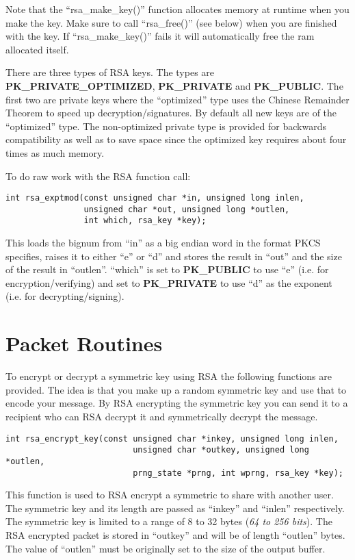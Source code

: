 \documentclass{book}
\begin{document}
Note that the ``rsa\_make\_key()'' function allocates memory at runtime when you make the key.  Make sure to call 
``rsa\_free()'' (see below) when you are finished with the key.  If ``rsa\_make\_key()'' fails it will automatically 
free the ram allocated itself.

There are three types of RSA keys.  The types are {\bf PK\_PRIVATE\_OPTIMIZED}, {\bf PK\_PRIVATE} and {\bf PK\_PUBLIC}.  The first
two are private keys where the ``optimized'' type uses the Chinese Remainder Theorem to speed up decryption/signatures.  By 
default all new keys are of the ``optimized'' type.  The non-optimized private type is provided for backwards compatibility
as well as to save space since the optimized key requires about four times as much memory.

To do raw work with the RSA function call:
\begin{verbatim}
int rsa_exptmod(const unsigned char *in, unsigned long inlen, 
                unsigned char *out, unsigned long *outlen, 
                int which, rsa_key *key);
\end{verbatim}
This loads the bignum from ``in'' as a big endian word in the format PKCS specifies, raises it to either ``e'' or ``d'' and stores the result
in ``out'' and the size of the result in ``outlen''. ``which'' is set to {\bf PK\_PUBLIC} to use ``e'' 
(i.e. for encryption/verifying) and set to {\bf PK\_PRIVATE} to use ``d'' as the exponent (i.e. for decrypting/signing).

\section{Packet Routines}
To encrypt or decrypt a symmetric key using RSA the following functions are provided.  The idea is that you make up
a random symmetric key and use that to encode your message.  By RSA encrypting the symmetric key you can send it to a
recipient who can RSA decrypt it and symmetrically decrypt the message.
\begin{verbatim}
int rsa_encrypt_key(const unsigned char *inkey, unsigned long inlen,
                          unsigned char *outkey, unsigned long *outlen,
                          prng_state *prng, int wprng, rsa_key *key);
\end{verbatim}
This function is used to RSA encrypt a symmetric to share with another user.  The symmetric key and its length are
passed as ``inkey'' and ``inlen'' respectively.  The symmetric key is limited to a range of 8 to 32 bytes 
(\textit{64 to 256 bits}).  The RSA encrypted packet is stored in ``outkey'' and will be of length ``outlen'' bytes.  The
value of ``outlen'' must be originally set to the size of the output buffer. 
\end{document}
